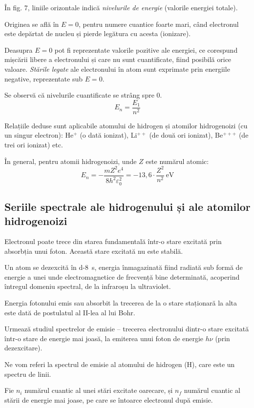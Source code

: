 În fig. 7, liniile orizontale indică \emph{nivelurile de energie} (valorile
energiei totale).

Originea se află în $E = 0$, pentru numere cuantice foarte mari, când
electronul este depărtat de nucleu și pierde legătura cu acesta (ionizare).

Deasupra $E = 0$ pot fi reprezentate valorile pozitive ale energiei, ce
corespund mișcării libere a electronului și care nu sunt cuantificate, fiind
posibilă orice valoare. \emph{Stările legate} ale electronului în atom sunt
exprimate prin energiile negative, reprezentate sub $E = 0$.

Se observă că nivelurile cuantificate se strâng spre 0.
\[ E_n = \frac{E_1}{n^2} \]

Relațiile deduse sunt aplicabile atomului de hidrogen și atomilor hidrogenoizi
(cu un singur electron): He$^+$ (o dată ionizat), Li$^{++}$ (de două ori
ionizat), Be$^{+++}$ (de trei ori ionizat) etc.

În general, pentru atomii hidrogenoizi, unde $Z$ este numărul atomic:
\[
    E_n = -\frac{mZ^2e^4}{8h^2\varepsilon_0^2}
    = -13,6 \cdot \frac{Z^2}{n^2} ~ \si{\electronvolt}
\]

\subsection{Seriile spectrale ale hidrogenului și ale atomilor hidrogenoizi}

Electronul poate trece din starea fundamentală într-o stare excitată prin
absorbția unui foton. Această stare excitată nu este stabilă.

Un atom se dezexcită în \SI{d-8}{\second}, energia înmagazinată fiind radiată
sub formă de energie a unei unde electromagnetice de frecvență bine
determinată, acoperind întregul domeniu spectral, de la infraroșu la
ultraviolet.

Energia fotonului emis sau absorbit la trecerea de la o stare staționară la
alta este dată de postulatul al II-lea al lui Bohr.

Urmează studiul spectrelor de emisie -- trecerea electronului dintr-o stare
excitată într-o stare de energie mai joasă, la emiterea unui foton de energie
$h\nu$ (prin dezexcitare).

Ne vom referi la spectrul de emisie al atomului de hidrogen (H), care este un
spectru de linii.

Fie $n_i$ numărul cuantic al unei stări excitate oarecare, și $n_f$ numărul
cuantic al stării de energie mai joase, pe care se întoarce electronul după
emisie.

